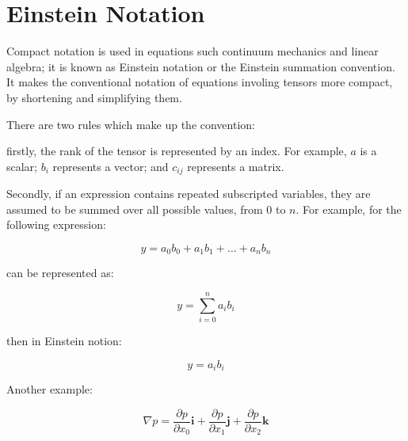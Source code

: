 
%
%
%


\section{Einstein Notation}
\label{EINSTEIN NOTATION}

Compact notation is used in equations such continuum mechanics and linear algebra; it is known as Einstein notation or the Einstein summation convention. It makes the conventional notation of equations involing tensors more compact, by shortening and simplifying them.

There are two rules which make up the convention:

firstly, the rank of the tensor is represented by an index. For example, $a$ is a scalar; $b_{i}$ represents a vector; and $c_{ij}$ represents a matrix.

Secondly, if an expression contains repeated subscripted variables, they are assumed to be summed over all possible values, from $0$ to $n$. For example, for the following expression:



\begin{equation}
y = a_{0}b_{0} + a_{1}b_{1} + \ldots + a_{n}b_{n}
\label{NOTATION1}
\end{equation}

can be represented as:

\begin{equation}
y = \sum_{i=0}^n  a_{i}b_{i}
\label{NOTATION2}
\end{equation}

then in Einstein notion:

\begin{equation}
y = a_{i}b_{i}
\label{NOTATION3}
\end{equation}

Another example:

\begin{equation}
\nabla p = \frac{\partial p}{\partial x_{0}}\textbf{i} + \frac{\partial p}{\partial x_{1}}\textbf{j} + \frac{\partial p}{\partial x_{2}}\textbf{k}
\label{NOTATION4}
\end{equation}

